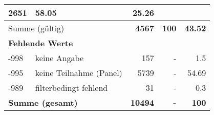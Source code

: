 \begin{longtable}{lXrrr}
       \num{2651} &
       \num[round-mode=places,round-precision=2]{58.05} &
         \num[round-mode=places,round-precision=2]{25.26} \\
     \midrule
     \multicolumn{2}{l}{Summe (gültig)} &
       \textbf{\num{4567}} &
     \textbf{\num{100}} &
       \textbf{\num[round-mode=places,round-precision=2]{43.52}} \\
     \multicolumn{5}{l}{\textbf{Fehlende Werte}}\\
       -998 &
       keine Angabe &
         \num{157} &
        - &
         \num[round-mode=places,round-precision=2]{1.5} \\
       -995 &
       keine Teilnahme (Panel) &
         \num{5739} &
        - &
         \num[round-mode=places,round-precision=2]{54.69} \\
       -989 &
       filterbedingt fehlend &
         \num{31} &
        - &
         \num[round-mode=places,round-precision=2]{0.3} \\
     \midrule
     \multicolumn{2}{l}{\textbf{Summe (gesamt)}} &
          \textbf{\num{10494}} &
        \textbf{-} &
        \textbf{\num{100}} \\
     \bottomrule
     \end{longtable}
     
